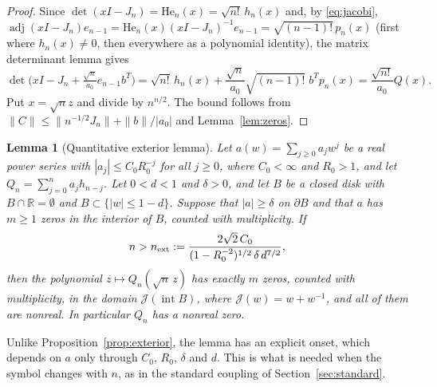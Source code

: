 \documentclass[11pt]{amsart}
\newtheorem{lemma}[theorem]{Lemma}
\theoremstyle{definition}
\theoremstyle{remark}
\numberwithin{equation}{section}
\newcommand{\R}{\mathbb{R}}
\newcommand{\He}{\mathrm{He}}
\begin{document}
\begin{proof}
Since $\det(xI-J_n)=\He_n(x)=\sqrt{n!}\,h_n(x)$ and, by \eqref{eq:jacobi}, $\operatorname{adj}(xI-J_n)e_{n-1}=\He_n(x)(xI-J_n)^{-1}e_{n-1}=\sqrt{(n-1)!}\,p_n(x)$ (first where $h_n(x)\ne0$, then everywhere as a polynomial identity), the matrix determinant lemma gives
\[
\det\bigl(xI-J_n+\tfrac{\sqrt n}{a_0}e_{n-1}b^T\bigr)=\sqrt{n!}\,h_n(x)+\frac{\sqrt n}{a_0}\sqrt{(n-1)!}\;b^Tp_n(x)=\frac{\sqrt{n!}}{a_0}Q(x).
\]
Put $x=\sqrt nz$ and divide by $n^{n/2}$. The bound follows from $\|C\|\le\|n^{-1/2}J_n\|+\|b\|/|a_0|$ and Lemma~\ref{lem:zeros}.
\end{proof}

\begin{lemma}[Quantitative exterior lemma]\label{lem:ext-quant}
Let $a(w)=\sum_{j\ge0}a_jw^j$ be a real power series with $|a_j|\le C_0R_0^{-j}$ for all $j\ge0$, where $C_0<\infty$ and $R_0>1$, and let $Q_n=\sum_{j=0}^{n}a_jh_{n-j}$. Let $0<d<1$ and $\delta>0$, and let $B$ be a closed disk with $B\cap\R=\emptyset$ and $B\subset\{|w|\le1-d\}$. Suppose that $|a|\ge\delta$ on $\partial B$ and that $a$ has $m\ge1$ zeros in the interior of $B$, counted with multiplicity. If
\begin{equation}\label{eq:n-ext}
n>n_{\rm ext}:=\frac{2\sqrt2\,C_0}{(1-R_0^{-2})^{1/2}\,\delta\,d^{7/2}},
\end{equation}
then the polynomial $z\mapsto Q_n(\sqrt n\,z)$ has exactly $m$ zeros, counted with multiplicity, in the domain $\mathcal J(\operatorname{int}B)$, where $\mathcal J(w)=w+w^{-1}$, and all of them are nonreal. In particular $Q_n$ has a nonreal zero.
\end{lemma}

Unlike Proposition~\ref{prop:exterior}, the lemma has an explicit onset, which depends on $a$ only through $C_0$, $R_0$, $\delta$ and $d$. This is what is needed when the symbol changes with $n$, as in the standard coupling of Section~\ref{sec:standard}.
\end{document}
